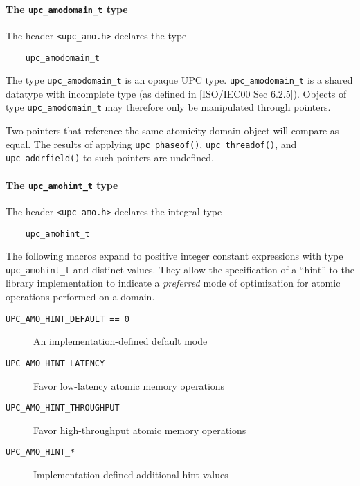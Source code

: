 \paragraph{The {\tt upc\_amodomain\_t} type}

\npf The header {\tt <upc\_amo.h>} declares the type
\begin{verbatim}
    upc_amodomain_t
\end{verbatim}

\np The type {\tt upc\_amodomain\_t} is an opaque UPC type.
    {\tt upc\_amodomain\_t} is a shared datatype with incomplete type (as 
    defined in [ISO/IEC00 Sec 6.2.5]).  Objects of type {\tt upc\_amodomain\_t}
    may therefore only be manipulated through pointers.

\np Two pointers that reference the same atomicity domain object will compare
    as equal.  The results of applying {\tt upc\_phaseof()},
    {\tt upc\_threadof()}, and {\tt upc\_addrfield()} to such pointers are
    undefined.

\paragraph{The {\tt upc\_amohint\_t} type}

\npf The header {\tt <upc\_amo.h>} declares the integral type
\begin{verbatim}
    upc_amohint_t
\end{verbatim}

\np The following macros expand to positive integer constant expressions 
    with type {\tt upc\_amohint\_t} and distinct values.
    They allow the specification of a ``hint'' to the library implementation to indicate
    a \emph{preferred} mode of optimization for atomic operations performed on a domain.
\begin{description}
  \item[{\tt UPC\_AMO\_HINT\_DEFAULT == 0}]
    An implementation-defined default mode
  \item[{\tt UPC\_AMO\_HINT\_LATENCY}]
    Favor low-latency atomic memory operations
  \item[{\tt UPC\_AMO\_HINT\_THROUGHPUT}]
    Favor high-throughput atomic memory operations
  \item[{\tt UPC\_AMO\_HINT\_*}]
    Implementation-defined additional hint values
\end{description}

\newpage
